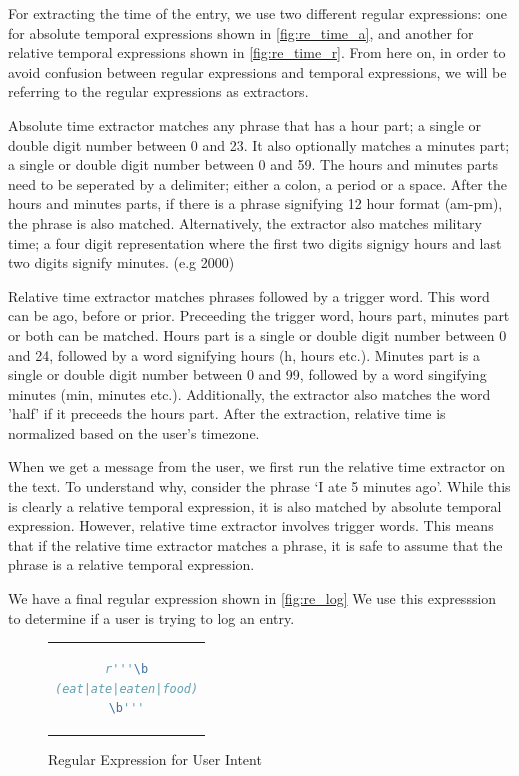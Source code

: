 For extracting the time of the entry, we use two different regular expressions: 
one for absolute temporal expressions shown in \autoref{fig:re_time_a}, and another for relative temporal expressions shown in \autoref{fig:re_time_r}.
From here on, in order to avoid confusion between regular expressions and temporal expressions, 
we will be referring to the regular expressions as extractors.

Absolute time extractor matches any phrase that has a hour part; a single or double digit number between 0 and 23.
It also optionally matches a minutes part; a single or double digit number between 0 and 59.
The hours and minutes parts need to be seperated by a delimiter; either a colon, a period or a space.
After the hours and minutes parts, if there is a phrase signifying 12 hour format (am-pm), the phrase is also matched.
Alternatively, the extractor also matches military time; a four digit representation where the first two digits signigy hours and last two digits signify minutes. (e.g 2000)

Relative time extractor matches phrases followed by a trigger word.
This word can be ago, before or prior.
Preceeding the trigger word, hours part, minutes part or both can be matched.
Hours part is a single or double digit number between 0 and 24, followed by a word signifying hours (h, hours etc.).
Minutes part is a single or double digit number between 0 and 99, followed by a word singifying minutes (min, minutes etc.).
Additionally, the extractor also matches the word 'half' if it preceeds the hours part.
After the extraction, relative time is normalized based on the user's timezone.

When we get a message from the user, we first run the relative time extractor on the text.
To understand why, consider the phrase `I ate 5 minutes ago'.
While this is clearly a relative temporal expression, it is also matched by absolute temporal expression.
However, relative time extractor involves trigger words.
This means that if the relative time extractor matches a phrase, it is safe to assume that the phrase is a relative temporal expression.

We have a final regular expression shown in \autoref{fig:re_log}
We use this expresssion to determine if a user is trying to log an entry.

\begin{figure}[htpb]
  \centering
  \begin{tabular}{c}
  \begin{lstlisting}[language=python]
r'''\b
(eat|ate|eaten|food)
\b'''
  \end{lstlisting}
  \end{tabular}
  \caption[Regular Expression for User Intent]{Regular Expression for User Intent}
  \label{fig:re_log}
\end{figure}

